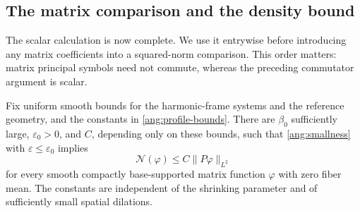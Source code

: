 \subsection{The matrix comparison and the density bound}

The scalar calculation is now complete.  We use it entrywise before
introducing any matrix coefficients into a squared-norm comparison.
This order matters: matrix principal symbols need not commute, whereas
the preceding commutator argument is scalar.

\begin{proposition}\label{ang:system-coercivity}
Fix uniform smooth bounds for the harmonic-frame systems and the
reference geometry, and the constants in \eqref{ang:profile-bounds}.
There are $\beta_0$ sufficiently large, $\varepsilon_0>0$, and $C$,
depending only on these bounds, such that
\eqref{ang:smallness} with $\varepsilon\le\varepsilon_0$ implies
\[
 \mathcal N(\varphi)\le C\|P\varphi\|_{L^2}
\]
for every smooth compactly base-supported matrix function $\varphi$
with zero fiber mean.  The constants are independent of the shrinking
parameter and of sufficiently small spatial dilations.
\end{proposition}

